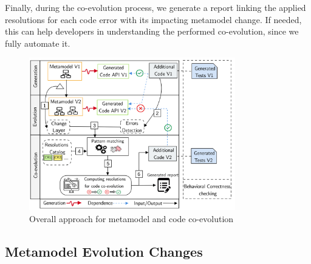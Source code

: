 Finally, during the co-evolution process, we generate a report linking the applied resolutions for each code error with its impacting metamodel change. If needed, this can help developers in understanding the performed co-evolution, since we fully automate it.
\begin{figure}[t]\centering%
	\centering
	\includegraphics[width=0.8\textwidth]{./pics/chapter1pics/ApproachV5.png}
	\caption{Overall approach for metamodel and code co-evolution}
	\label{fig:overallapproach}
	\vspace{-1em}
\end{figure}
\subsection{Metamodel Evolution Changes}
\label{mmchanges}

